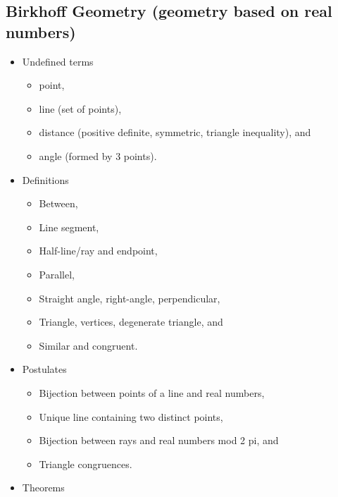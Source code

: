 \hypertarget{birkhoff-geometry-geometry-based-on-real-numbers}{%
\subsection{Birkhoff Geometry (geometry based on real
numbers)}\label{birkhoff-geometry-geometry-based-on-real-numbers}}

\begin{itemize}
\tightlist
\item
  Undefined terms

  \begin{itemize}
  \tightlist
  \item
    point,
  \item
    line (set of points),
  \item
    distance (positive definite, symmetric, triangle inequality), and
  \item
    angle (formed by 3 points).
  \end{itemize}
\item
  Definitions

  \begin{itemize}
  \tightlist
  \item
    Between,
  \item
    Line segment,
  \item
    Half-line/ray and endpoint,
  \item
    Parallel,
  \item
    Straight angle, right-angle, perpendicular,
  \item
    Triangle, vertices, degenerate triangle, and
  \item
    Similar and congruent.
  \end{itemize}
\item
  Postulates

  \begin{itemize}
  \tightlist
  \item
    Bijection between points of a line and real numbers,
  \item
    Unique line containing two distinct points,
  \item
    Bijection between rays and real numbers mod 2 pi, and
  \item
    Triangle congruences.
  \end{itemize}
\item
  Theorems


\end{itemize}
